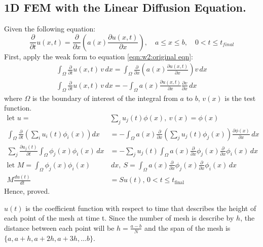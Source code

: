 \documentclass{article}
\begin{document}
\subsection{1D FEM with the Linear Diffusion Equation.}%
\label{sub:1D FEM with the Linear Diffusion Equation.}
Given the following equation:
\begin{equation}
  \frac{\partial}{\partial t} u(x,t) = \frac{\partial}{\partial x} \left( a(x) \frac{\partial u(x,t)}{\partial x} \right), \quad a \leq x \leq b, \quad 0 < t \leq t_{final} \label{eqn:w2:original eqn}
\end{equation}
First, apply the weak form to equation \ref{eqn:w2:original eqn}:
\begin{align}
  \int_{\Omega} \frac{\partial}{\partial t} u(x,t) \, v \, dx = \int_{\Omega} \frac{\partial}{\partial x} \left( a(x) \frac{\partial u(x,t)}{\partial x} \right) v \, dx \\
  \int_{\Omega} \frac{\partial}{\partial t} u(x,t) \, v \, dx = - \int_{\Omega}  a(x) \frac{\partial u(x,t)}{\partial x} \frac{\partial v}{\partial x} \, dx
\end{align}
where $\Omega$ is the boundary of interest of the integral from $a$ to $b$, $v(x)$ is the test function.
\begin{align}
  \text{let } u = & \sum_j u_j (t) \phi(x) ,\ v(x) = \phi(x) \\
  \int_{\Omega} \frac{\partial}{\partial t} \left( \sum_{i} u_{i}(t) \phi_{i}(x) \right) dx &= -\int_{\Omega} a(x) \frac{\partial}{\partial x} \left( \sum_{j} u_{j}(t) \phi_{j}(x) \right) \frac{\partial \phi(x)}{\partial x} \, dx \\
  \sum_j \frac{\partial u_j(t)}{\partial t} \int_{\Omega} \phi_j(x) \phi_i(x) \, dx &= - \sum_j u_j(t) \int_{\Omega} a(x) \frac{\partial}{\partial x} \phi_j(x) \frac{\partial}{\partial x} \phi_i(x) \, dx \\
  \text{let } M = \int_{\Omega} \phi_j(x) \phi_i(x)& \, dx ,\ S = \int_{\Omega} a(x) \frac{\partial}{\partial x} \phi_j(x) \frac{\partial}{\partial x} \phi_i(x) \, dx \\
  M \frac{d {u(t)}}{d {t}} &= S u(t), \, 0 < t \le t_{\text{final}} \label{eqn:w2:derived 1}
\end{align}
Hence, proved.

$u(t)$ is the coefficient function with respect to time that describes the height of each point of the mesh at time t. Since the number of mesh is describe by $h$, the distance between each point will be $h = \frac{a - b}{N}$ and the span of the mesh is $\{a, a+h, a+2h, a+3h, \dots b\}$.
\end{document}
